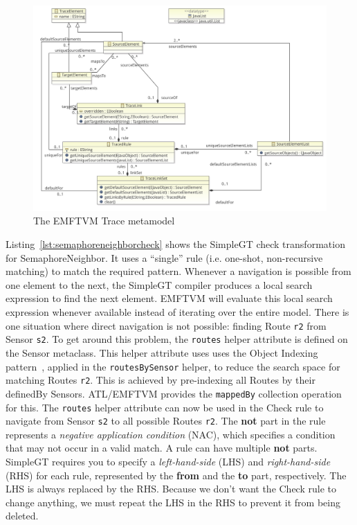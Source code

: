 \documentclass[submission,copyright,creativecommons]{eptcs}
\begin{document}
\begin{figure}[ht]
\centerline{
\includegraphics[width=15cm]{figures/trace}}
\caption{The EMFTVM Trace metamodel}
\label{fig:emftvm-trace}
\end{figure}

Listing~\ref{lst:semaphoreneighborcheck} shows the SimpleGT check transformation for SemaphoreNeighbor. It uses a ``single'' rule (i.e. one-shot, non-recursive matching) to match the required pattern. Whenever a navigation is possible from one element to the next, the SimpleGT compiler produces a local search expression to find the next element. EMFTVM will evaluate this local search expression whenever available instead of iterating over the entire model. There is one situation where direct navigation is not possible: finding Route \texttt{r2} from Sensor \texttt{s2}. To get around this problem, the \texttt{routes} helper attribute is defined on the Sensor metaclass. This helper attribute uses uses the Object Indexing pattern~\cite{conf/icsea/Lano2011}, applied in the \texttt{routesBySensor} helper, to reduce the search space for matching Routes \texttt{r2}. This is achieved by pre-indexing all Routes by their definedBy Sensors. ATL/EMFTVM provides the \texttt{mappedBy} collection operation for this. The \texttt{routes} helper attribute can now be used in the Check rule to navigate from Sensor \texttt{s2} to all possible Routes \texttt{r2}. The \textbf{not} part in the rule represents a \emph{negative application condition} (NAC), which specifies a condition that may not occur in a valid match. A rule can have multiple \textbf{not} parts. SimpleGT requires you to specify a \emph{left-hand-side} (LHS) and \emph{right-hand-side} (RHS) for each rule, represented by the \textbf{from} and the \textbf{to} part, respectively. The LHS is always replaced by the RHS. Because we don't want the Check rule to change anything, we must repeat the LHS in the RHS to prevent it from being deleted.
\end{document}
